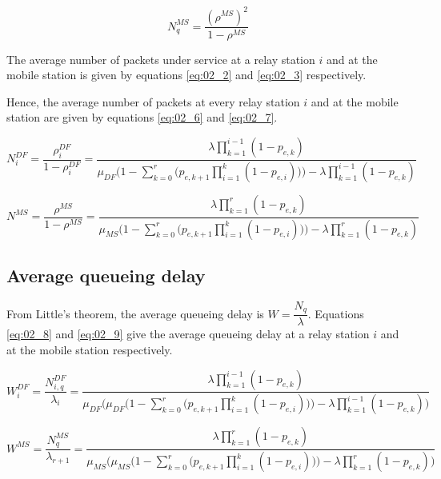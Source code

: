 \begin{equation}
  N_q^{MS} = \dfrac{(\rho^{MS})^2}{1 - \rho^{MS}}
  \label{eq:02_5}
\end{equation}

The average number of packets under service at a relay station $i$ and at the
mobile station is given by equations \ref{eq:02_2} and \ref{eq:02_3} respectively.

Hence, the average number of packets at every relay station $i$ and at the
mobile station are given by equations \ref{eq:02_6} and \ref{eq:02_7}.

\begin{equation}
  N_i^{DF} = \dfrac{\rho_i^{DF}}{1 - \rho_i^{DF}} =
    \dfrac{\lambda \prod\limits_{k=1}^{i-1} (1 - p_{e,k})}{\mu_{DF}\Bigg(1 - \sum\limits_{k=0}^r \Big(p_{e,k+1} \prod\limits_{i=1}^k (1 - p_{e,i})\Big)\Bigg)-\lambda \prod\limits_{k=1}^{i-1} (1 - p_{e,k})}
  \label{eq:02_6}
\end{equation}

\begin{equation}
  N^{MS} =  \dfrac{\rho^{MS}}{1 - \rho^{MS}} =
    \dfrac{\lambda \prod\limits_{k=1}^{r} (1 - p_{e,k})}{\mu_{MS}\Bigg(1 - \sum\limits_{k=0}^r \Big(p_{e,k+1} \prod\limits_{i=1}^k (1 - p_{e,i})\Big)\Bigg)-\lambda \prod\limits_{k=1}^{r} (1 - p_{e,k})}
  \label{eq:02_7}
\end{equation}


\subsection{Average queueing delay}

From Little's theorem, the average queueing delay is $W = \dfrac{N_q}{\lambda}$.
Equations \ref{eq:02_8} and \ref{eq:02_9} give the average queueing delay at a
relay station $i$ and at the mobile station respectively.

\begin{equation}
  W_i^{DF} = \dfrac{N_{i,q}^{DF}}{\lambda_i} =
  \dfrac{\lambda \prod\limits_{k=1}^{i-1} (1 - p_{e,k})}{\mu_{DF}\Bigg(\mu_{DF}\Big(1 - \sum\limits_{k=0}^r \Big(p_{e,k+1} \prod\limits_{i=1}^k (1 - p_{e,i})\Big)\Big)-\lambda \prod\limits_{k=1}^{i-1} (1 - p_{e,k})\Bigg)}
  \label{eq:02_8}
\end{equation}

\begin{equation}
  W^{MS} = \dfrac{N_q^{MS}}{\lambda_{r+1}} =
  \dfrac{\lambda \prod\limits_{k=1}^{r} (1 - p_{e,k})}{\mu_{MS}\Bigg(\mu_{MS}\Big(1 - \sum\limits_{k=0}^r \Big(p_{e,k+1} \prod\limits_{i=1}^k (1 - p_{e,i})\Big)\Big)-\lambda \prod\limits_{k=1}^{r} (1 - p_{e,k})\Bigg)}
  \label{eq:02_9}
\end{equation}


